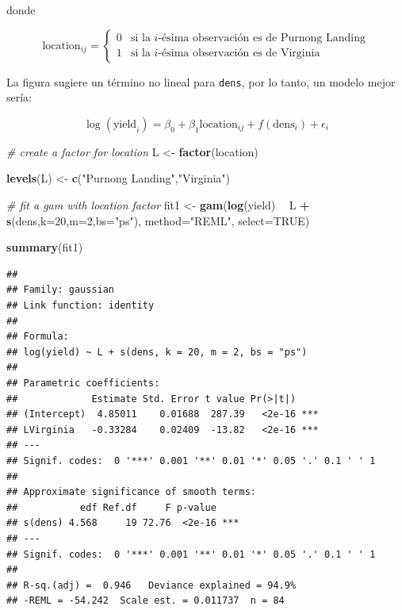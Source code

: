\documentclass[]{book}
\newenvironment{Shaded}{\begin{snugshade}}{\end{snugshade}}
\newcommand{\KeywordTok}[1]{\textcolor[rgb]{0.13,0.29,0.53}{\textbf{#1}}}
\newcommand{\DataTypeTok}[1]{\textcolor[rgb]{0.13,0.29,0.53}{#1}}
\newcommand{\DecValTok}[1]{\textcolor[rgb]{0.00,0.00,0.81}{#1}}
\newcommand{\StringTok}[1]{\textcolor[rgb]{0.31,0.60,0.02}{#1}}
\newcommand{\CommentTok}[1]{\textcolor[rgb]{0.56,0.35,0.01}{\textit{#1}}}
\newcommand{\OtherTok}[1]{\textcolor[rgb]{0.56,0.35,0.01}{#1}}
\newcommand{\OperatorTok}[1]{\textcolor[rgb]{0.81,0.36,0.00}{\textbf{#1}}}
\newcommand{\NormalTok}[1]{#1}
\begin{document}
donde

\[
\text{location}_{ij} =
\left\{
\begin{array}{cl}
0 & \mbox{si la $i$-ésima observación es de Purnong Landing} \\
1 & \mbox{si la $i$-ésima observación es de Virginia}
\end{array}
\right.
\]

La figura sugiere un término no lineal para \texttt{dens}, por lo tanto,
un modelo mejor sería:

\[
\log(\text{yield}_i) = \beta_0 + \beta_1\text{location}_{ij} + f(\text{dens}_i) + \epsilon_i
\]

\begin{Shaded}
\begin{Highlighting}[]
\CommentTok{# create a factor for location}
\NormalTok{L <-}\StringTok{ }\KeywordTok{factor}\NormalTok{(location)}

\KeywordTok{levels}\NormalTok{(L) <-}\StringTok{ }\KeywordTok{c}\NormalTok{(}\StringTok{"Purnong Landing"}\NormalTok{,}\StringTok{"Virginia"}\NormalTok{)}

\CommentTok{# fit a gam with location factor}
\NormalTok{fit1 <-}\StringTok{ }\KeywordTok{gam}\NormalTok{(}\KeywordTok{log}\NormalTok{(yield) }\OperatorTok{~}\StringTok{ }\NormalTok{L }\OperatorTok{+}\StringTok{ }\KeywordTok{s}\NormalTok{(dens,}\DataTypeTok{k=}\DecValTok{20}\NormalTok{,}\DataTypeTok{m=}\DecValTok{2}\NormalTok{,}\DataTypeTok{bs=}\StringTok{"ps"}\NormalTok{),}
            \DataTypeTok{method=}\StringTok{"REML"}\NormalTok{, }\DataTypeTok{select=}\OtherTok{TRUE}\NormalTok{)}

\KeywordTok{summary}\NormalTok{(fit1)}
\end{Highlighting}
\end{Shaded}

\begin{verbatim}
## 
## Family: gaussian 
## Link function: identity 
## 
## Formula:
## log(yield) ~ L + s(dens, k = 20, m = 2, bs = "ps")
## 
## Parametric coefficients:
##             Estimate Std. Error t value Pr(>|t|)    
## (Intercept)  4.85011    0.01688  287.39   <2e-16 ***
## LVirginia   -0.33284    0.02409  -13.82   <2e-16 ***
## ---
## Signif. codes:  0 '***' 0.001 '**' 0.01 '*' 0.05 '.' 0.1 ' ' 1
## 
## Approximate significance of smooth terms:
##           edf Ref.df     F p-value    
## s(dens) 4.568     19 72.76  <2e-16 ***
## ---
## Signif. codes:  0 '***' 0.001 '**' 0.01 '*' 0.05 '.' 0.1 ' ' 1
## 
## R-sq.(adj) =  0.946   Deviance explained = 94.9%
## -REML = -54.242  Scale est. = 0.011737  n = 84
\end{verbatim}
\end{document}
